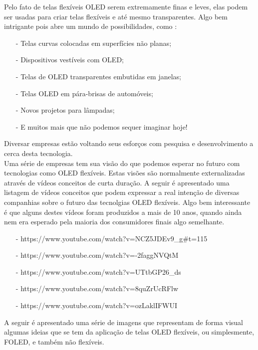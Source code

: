 Pelo fato de telas flexíveis OLED serem extremamente finas e leves, elas podem ser usadas para criar telas flexíveis e até mesmo transparentes. Algo bem intrigante pois abre um mundo de possibilidades, como \cite{OIBOI}: 

\begin{enumerate}
    \item[-] Telas curvas colocadas em superfícies não planas;
    \item[-] Dispositivos vestíveis com OLED;
    \item[-] Telas de OLED transparentes embutidas em janelas;
    \item[-] Telas OLED em pára-brisas de automóveis;
    \item[-] Novos projetos para lâmpadas;
    \item[-] E muitos mais que não podemos sequer imaginar hoje!
\end{enumerate}

Diversar empresas estão voltando seus esforços com pesquisa e desenvolvimento a cerca desta tecnologia. \\

Uma série de empresas tem sua visão do que podemos esperar no futuro com tecnologias como OLED flexíveis. Estas visões são normalmente externalizadas através de vídeos conceitos de curta duração. A seguir é apresentado uma listagem de vídeos conceitos que podem expressar a real intenção de diversas companhias sobre o futuro das tecnolgias OLED flexíveis. Algo bem interessante é que alguns destes vídeos foram produzidos a mais de 10 anos, quando ainda nem era esperado pela maioria dos consumidores finais algo semelhante.

\begin{enumerate}
    \item[-] https://www.youtube.com/watch?v=NCZ5JDEv9\_g\#t=115
    \item[-] https://www.youtube.com/watch?v=-2faggNVQtM
    \item[-] https://www.youtube.com/watch?v=UTtbGP26\_ds
    \item[-] https://www.youtube.com/watch?v=8quZrUcRFlw
    \item[-] https://www.youtube.com/watch?v=ozLaklIFWUI
\end{enumerate}

A seguir é apresentado uma série de imagens que representam de forma visual algumas ideias que se tem da aplicação de telas OLED flexíveis, ou simplesmente, FOLED, e também não flexíveis.\\

